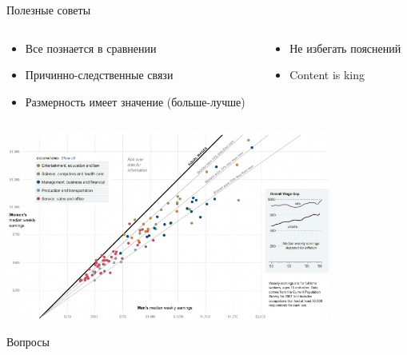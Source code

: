 \documentclass[10pt]{beamer}
\begin{document}
\begin{frame}{Полезные советы}

\begin{columns}[T]
    \begin{column}{.5\textwidth}    	
    	\begin{itemize}
		\item Все познается в сравнении
		\item Причинно-следственные связи
		\item Размерность имеет значение (больше-лучше)
		\end{itemize}	
    \end{column}
    \begin{column}{.5\textwidth}
    \begin{itemize}
		\item Не избегать пояснений
		\item Content is king
		\end{itemize}		
    \end{column}
  \end{columns}
  
  \begin{center}
   		\includegraphics[width=0.8\textwidth]{images/salaries.png}
    \end{center}

\end{frame}

\begin{frame}[plain]
\begin{center}
{\Large Вопросы}
\end{center}
\end{frame}
\end{document}
